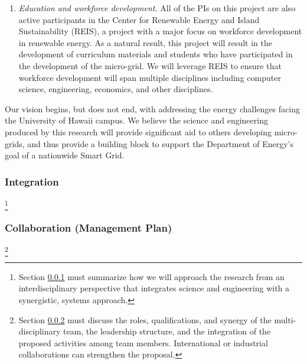 \begin{enumerate}
\item {\em Education and workforce development.}  All of the PIs on this
  project are also active participants in the Center for Renewable Energy
  and Island Sustainability (REIS), a project with a major focus on
  workforce development in renewable energy.  As a natural result, this
  project will result in the development of curriculum materials and
  students who have participated in the development of the micro-grid.  We
  will leverage REIS to ensure that workforce development will span
  multiple disciplines including computer science, engineering, economics,
  and other disciplines.

\end{enumerate}

Our vision begins, but does not end, with addressing the energy challenges
facing the University of Hawaii campus.  We believe the science and
engineering produced by this research will provide significant aid to
others developing micro-grids, and thus provide a building block to support
the Department of Energy's goal of a nationwide Smart Grid.

\subsubsection{Integration}
\label{sec:integration}

\footnote{Section \ref{sec:integration} must summarize how we will approach the research from an
  interdisciplinary perspective that integrates science and engineering
  with a synergistic, systems approach.}



\subsubsection{Collaboration (Management Plan)}
\label{sec:collaboration}

\footnote{Section \ref{sec:collaboration} must discuss the roles, qualifications, and
  synergy of the multi-disciplinary team, the leadership structure, and the
  integration of the proposed activities among team members.  
  International or industrial collaborations can strengthen the proposal.
}



